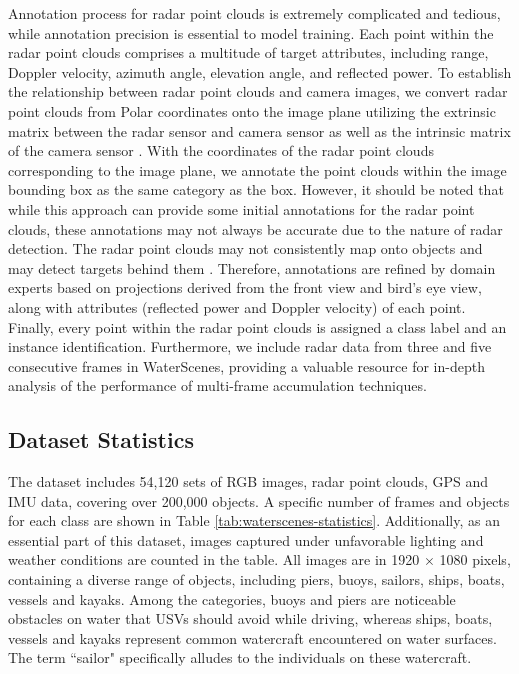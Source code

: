 \documentclass[lettersize,journal]{IEEEtran}
\begin{document}
Annotation process for radar point clouds is extremely complicated and tedious, while annotation precision is essential to model training. 
Each point within the radar point clouds comprises a multitude of target attributes, including range, Doppler velocity, azimuth angle, elevation angle, and reflected power.
To establish the relationship between radar point clouds and camera images, we convert radar point clouds from Polar coordinates onto the image plane utilizing the extrinsic matrix between the radar sensor and camera sensor as well as the intrinsic matrix of the camera sensor \cite{domhof2021joint}.
With the coordinates of the radar point clouds corresponding to the image plane, we annotate the point clouds within the image bounding box as the same category as the box.
However, it should be noted that while this approach can provide some initial annotations for the radar point clouds, these annotations may not always be accurate due to the nature of radar detection. 
The radar point clouds may not consistently map onto objects and may detect targets behind them \cite{meyer2019deep, stacker2022fusion}. Therefore, annotations are refined by domain experts based on projections derived from the front view and bird's eye view, along with attributes (reflected power and Doppler velocity) of each point. 
Finally, every point within the radar point clouds is assigned a class label and an instance identification.
Furthermore, we include radar data from three and five consecutive frames in WaterScenes, providing a valuable resource for in-depth analysis of the performance of multi-frame accumulation techniques.

\subsection{Dataset Statistics}

The dataset includes 54,120 sets of RGB images, radar point clouds, GPS and IMU data, covering over 200,000 objects. A specific number of frames and objects for each class are shown in Table \ref{tab:waterscenes-statistics}. Additionally, as an essential part of this dataset, images captured under unfavorable lighting and weather conditions are counted in the table. All images are in 1920 $\times$ 1080 pixels, containing a diverse range of objects, including piers, buoys, sailors, ships, boats, vessels and kayaks. Among the categories, buoys and piers are noticeable obstacles on water that USVs should avoid while driving, whereas ships, boats, vessels and kayaks represent common watercraft encountered on water surfaces. The term ``sailor" specifically alludes to the individuals on these watercraft.
\end{document}
